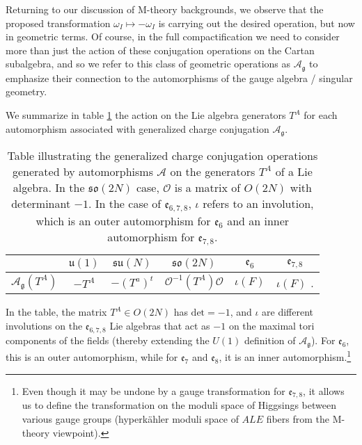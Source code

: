\documentclass[12pt]{article}%
\numberwithin{equation}{section}
\renewcommand{\(}{\left(}
\renewcommand{\)}{\right)}
\renewcommand{\[}{\left[}
\renewcommand{\]}{\right]}
\begin{document}
Returning to our discussion of M-theory backgrounds, we observe that the proposed transformation $\omega_{I} \mapsto - \omega_{I}$ is carrying out the desired operation, but now in geometric terms. Of course, in the full compactification we need to consider more than just the action of these conjugation operations on the Cartan subalgebra, and so we refer to this class of geometric operations as $\mathcal{A}_{\mathfrak{g}}$
to emphasize their connection to the automorphisms of the gauge algebra / singular geometry.

We summarize in table \ref{tab:AUTO} the action on the Lie algebra generators $T^A$ for
each automorphism associated with generalized charge conjugation $\mathcal{A}_{\mathfrak{g}}$.
\begin{table}[t!]
\begin{center}
\begin{tabular}{c|c|c|c|c|c}
 & $\mathfrak{u}(1)$ & $\mathfrak{su}(N)$ & $\mathfrak{so}(2N)$ & $\mathfrak{e}_6$ & $\mathfrak{e}_{7,8}$\\
 \hline
$\mathcal{A}_{\mathfrak{g}}(T^A)$ &$ - T^A$ &$-(T^a)^t$ & $\mathcal{O}^{-1}(T^A)\mathcal{O}$ & $\iota(F)$ & $\iota(F)$
.
\end{tabular}
\end{center}
\caption{Table illustrating the generalized charge conjugation operations generated by automorphisms $\mathcal{A}$ on the generators $T^A$ of a Lie algebra. In the $\mathfrak{so}(2N)$ case, $\mathcal{O}$ is a matrix of $O(2N)$ with determinant $-1$. In the case of $\mathfrak{e}_{6,7,8}$, $\iota$ refers to an involution, which is an outer automorphism for $\mathfrak{e}_6$ and an inner automorphism for $\mathfrak{e}_{7,8}$.}\label{tab:AUTO}
\end{table}
In the table, the matrix $T^A \in O(2N)$ has $\text{det}=-1$, and $\iota$ are different involutions on the $\mathfrak{e}_{6,7,8} $ Lie algebras that act as $-1$ on the maximal tori components of the fields (thereby extending the $U(1)$ definition of $\mathcal{A}_{\mathfrak{g}}$).
For $\mathfrak{e}_{6}$, this is an outer automorphism, while for
$\mathfrak{e}_7$ and $\mathfrak{e}_8$, it is an inner
automorphism.\footnote{Even though it may be undone by a gauge transformation for $\mathfrak{e}_{7,8}$,
it allows us to define the transformation on the moduli space of Higgsings
between various gauge groups (hyperk\"ahler moduli space of $ALE$ fibers from the M-theory viewpoint).}
\end{document}
